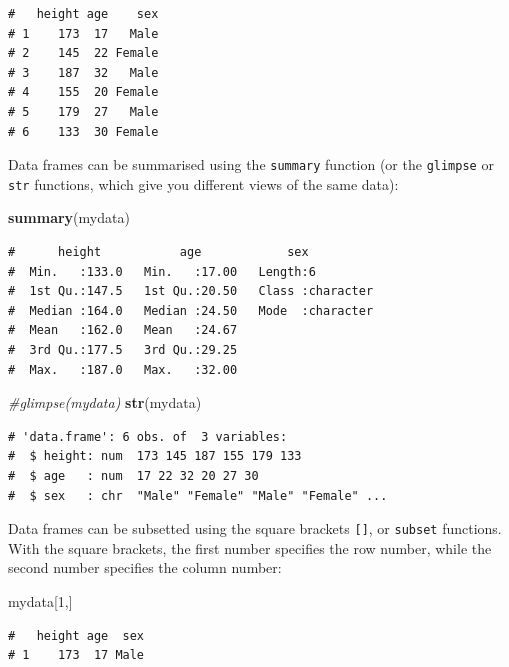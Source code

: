 \documentclass[
  a4paperpaper,
]{book}
\newenvironment{Shaded}{\begin{snugshade}}{\end{snugshade}}
\newcommand{\CommentTok}[1]{\textcolor[rgb]{0.56,0.35,0.01}{\textit{#1}}}
\newcommand{\DecValTok}[1]{\textcolor[rgb]{0.00,0.00,0.81}{#1}}
\newcommand{\KeywordTok}[1]{\textcolor[rgb]{0.13,0.29,0.53}{\textbf{#1}}}
\newcommand{\NormalTok}[1]{#1}
\begin{document}
\begin{verbatim}
#   height age    sex
# 1    173  17   Male
# 2    145  22 Female
# 3    187  32   Male
# 4    155  20 Female
# 5    179  27   Male
# 6    133  30 Female
\end{verbatim}

Data frames can be summarised using the \texttt{summary} function (or the \texttt{glimpse} or \texttt{str} functions, which give you different views of the same data):

\begin{Shaded}
\begin{Highlighting}[]
\KeywordTok{summary}\NormalTok{(mydata)}
\end{Highlighting}
\end{Shaded}

\begin{verbatim}
#      height           age            sex           
#  Min.   :133.0   Min.   :17.00   Length:6          
#  1st Qu.:147.5   1st Qu.:20.50   Class :character  
#  Median :164.0   Median :24.50   Mode  :character  
#  Mean   :162.0   Mean   :24.67                     
#  3rd Qu.:177.5   3rd Qu.:29.25                     
#  Max.   :187.0   Max.   :32.00
\end{verbatim}

\begin{Shaded}
\begin{Highlighting}[]
\CommentTok{\#glimpse(mydata)}
\KeywordTok{str}\NormalTok{(mydata)}
\end{Highlighting}
\end{Shaded}

\begin{verbatim}
# 'data.frame':	6 obs. of  3 variables:
#  $ height: num  173 145 187 155 179 133
#  $ age   : num  17 22 32 20 27 30
#  $ sex   : chr  "Male" "Female" "Male" "Female" ...
\end{verbatim}

Data frames can be subsetted using the square brackets \texttt{{[}{]}}, or \texttt{subset} functions. With the square brackets, the first number specifies the row number, while the second number specifies the column number:

\begin{Shaded}
\begin{Highlighting}[]
\NormalTok{mydata[}\DecValTok{1}\NormalTok{,]}
\end{Highlighting}
\end{Shaded}

\begin{verbatim}
#   height age  sex
# 1    173  17 Male
\end{verbatim}
\end{document}
